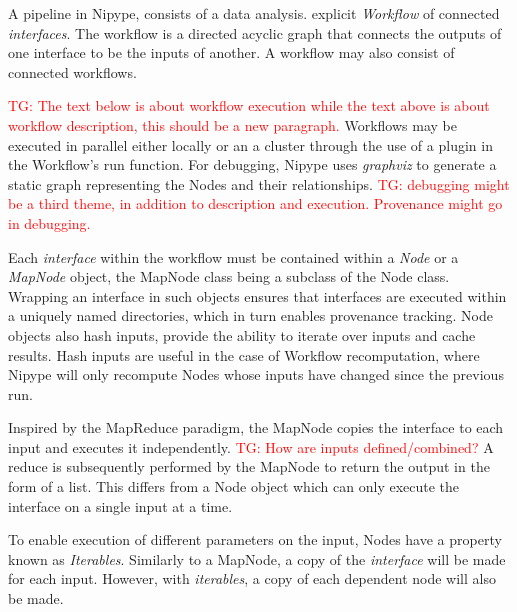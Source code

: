 \documentclass{report}
\newcommand{\tristan}[1]{\textcolor{red}{TG: #1}}
\begin{document}
		A pipeline in Nipype, consists of a data analysis. explicit
                \textit{Workflow} of connected
                \textit{interfaces}. The workflow is a directed
                acyclic graph that connects the outputs of one
                interface to be the inputs of another. A workflow may
                also consist of connected workflows.

                \tristan{The text below is about workflow execution
                  while the text above is about workflow description,
                  this should be a new paragraph.}  Workflows may be
                executed in parallel either locally or an a cluster
                through the use of a plugin in the Workflow's run
                function. For debugging, Nipype uses \textit{graphviz}
                to generate a static graph representing the Nodes and
                their relationships. \tristan{debugging might be a
                  third theme, in addition to description and
                  execution. Provenance might go in debugging.}
		
		 Each \textit{interface} within the workflow must be
                 contained within a \textit{Node} or a
                 \textit{MapNode} object, the MapNode class being a
                 subclass of the Node class. Wrapping an interface in
                 such objects ensures that interfaces are executed
                 within a uniquely named directories, which in turn
                 enables provenance tracking. Node objects also hash
                 inputs, provide the ability to iterate over inputs
                 and cache results. Hash inputs are useful in the case
                 of Workflow recomputation, where Nipype will only
                 recompute Nodes whose inputs have changed since the
                 previous run.
		
		Inspired by the MapReduce paradigm, the MapNode copies
                the interface to each input and executes it
                independently. \tristan{How are inputs defined/combined?} A reduce is subsequently performed by
                the MapNode to return the output in the form of a
                list. This differs from a Node object which can only
                execute the interface on a single input at a time.
		
		To enable execution of different parameters on the
                input, Nodes have a property known as
                \textit{Iterables}. Similarly to a MapNode, a copy of
                the \textit{interface} will be made for each
                input. However, with \textit{iterables}, a copy of
                each dependent node will also be made.
		 
\end{document}

